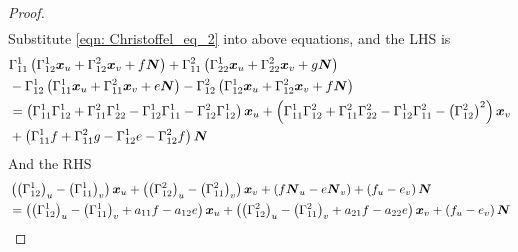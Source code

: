 \documentclass[11pt]{article}
\begin{document}
\begin{itemize}
\begin{proof}
\begin{align*}
\end{align*}
Substitute \eqref{eqn: Christoffel_eq_2} into above equations, and the LHS is 
\begin{align*}
&\Gamma_{11}^{1}\left(\Gamma_{12}^{1}\boldsymbol{x}_{u} + \Gamma_{12}^{2}\boldsymbol{x}_{v} + f\boldsymbol{N}\right) + \Gamma_{11}^{2}\left(\Gamma_{22}^{1}\boldsymbol{x}_{u} + \Gamma_{22}^{2}\boldsymbol{x}_{v} + g\boldsymbol{N}\right)\\
& - \Gamma_{12}^{1}\left(\Gamma_{11}^{1}\boldsymbol{x}_{u} + \Gamma_{11}^{2}\boldsymbol{x}_{v} + e\boldsymbol{N}\right) - \Gamma_{12}^{2}\left(\Gamma_{12}^{1}\boldsymbol{x}_{u} + \Gamma_{12}^{2}\boldsymbol{x}_{v} + f\boldsymbol{N}\right)\\
&=   \left(\Gamma_{11}^{1}\Gamma_{12}^{1} +   \Gamma_{11}^{2}\Gamma_{22}^{1} - \Gamma_{12}^{1}\Gamma_{11}^{1}   - \Gamma_{12}^{2}\Gamma_{12}^{1}  \right)\boldsymbol{x}_{u} 
+  \left(\Gamma_{11}^{1}\Gamma_{12}^{2} + \Gamma_{11}^{2}\Gamma_{22}^{2} - \Gamma_{12}^{1}\Gamma_{11}^{2}     - \left(\Gamma_{12}^{2}\right)^{2}  \right)\boldsymbol{x}_{v} \\
& + \left(\Gamma_{11}^{1}f + \Gamma_{11}^{2}g   - \Gamma_{12}^{1}e - \Gamma_{12}^{2}f \right)\boldsymbol{N}
\end{align*}
And the RHS
\begin{align*}
&\left(\left(\Gamma_{12}^{1}\right)_{u}-\left(\Gamma_{11}^{1}\right)_{v}\right)\boldsymbol{x}_{u} +\left(  \left(\Gamma_{12}^{2}\right)_{u}- \left(\Gamma_{11}^{2}\right)_{v}\right)\boldsymbol{x}_{v} +\left(f\boldsymbol{N}_{u} - e\boldsymbol{N}_{v}\right)+ \left(f_{u}-e_{v}\right)\boldsymbol{N}\\
&=\left(\left(\Gamma_{12}^{1}\right)_{u}-\left(\Gamma_{11}^{1}\right)_{v} + a_{11}f - a_{12}e\right)\boldsymbol{x}_{u}
+\left(\left(\Gamma_{12}^{2}\right)_{u}- \left(\Gamma_{11}^{2}\right)_{v} + a_{21}f - a_{22}e\right)\boldsymbol{x}_{v}+ \left(f_{u}-e_{v}\right)\boldsymbol{N} 
\end{align*}


\end{proof}
\end{itemize}
\end{document}

